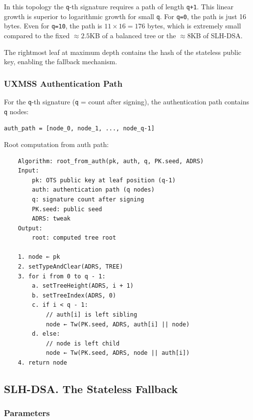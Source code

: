 In this topology the \texttt{q}-th signature requires a path of length \texttt{q+1}. This linear growth is superior 
to logarithmic growth for small \texttt{q}. For \texttt{q=0}, the path is just 16 bytes. Even for \texttt{q=10}, the path 
is $11 \times 16 = 176$ bytes, which is extremely small compared to the fixed $\approx 2.5$KB of a balanced 
tree or the $\approx 8$KB of SLH-DSA.

The rightmost leaf at maximum depth contains the hash of the stateless public key, enabling the 
fallback mechanism.


\subsubsection{UXMSS Authentication Path}
For the \texttt{q}-th signature (\texttt{q} = count after signing), the authentication path contains \texttt{q} nodes:
\begin{center}
    \texttt{auth\_path = [node\_0, node\_1, ..., node\_{q-1}]}
\end{center}

Root computation from auth path:

\begin{verbatim}
    Algorithm: root_from_auth(pk, auth, q, PK.seed, ADRS)
    Input:
        pk: OTS public key at leaf position (q-1)
        auth: authentication path (q nodes)
        q: signature count after signing
        PK.seed: public seed
        ADRS: tweak
    Output:
        root: computed tree root

    1. node ← pk
    2. setTypeAndClear(ADRS, TREE)
    3. for i from 0 to q - 1:
        a. setTreeHeight(ADRS, i + 1)
        b. setTreeIndex(ADRS, 0)
        c. if i < q - 1:
            // auth[i] is left sibling
            node ← Tw(PK.seed, ADRS, auth[i] || node)
        d. else:
            // node is left child
            node ← Tw(PK.seed, ADRS, node || auth[i])
    4. return node
\end{verbatim}


\subsection{SLH-DSA. The Stateless Fallback}

\subsubsection{Parameters}

